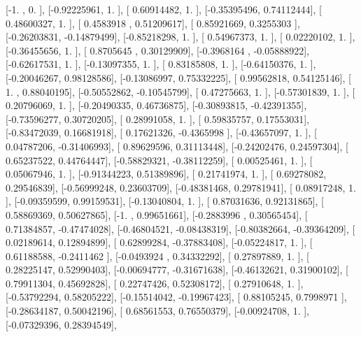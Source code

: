 \documentclass{article}
\begin{document}
       [-1.        ,  0.        ],
       [-0.92225961,  1.        ],
       [ 0.60914482,  1.        ],
       [-0.35395496,  0.74112444],
       [ 0.48600327,  1.        ],
       [ 0.4583918 ,  0.51209617],
       [ 0.85921669,  0.3255303 ],
       [-0.26203831, -0.14879499],
       [-0.85218298,  1.        ],
       [ 0.54967373,  1.        ],
       [ 0.02220102,  1.        ],
       [-0.36455656,  1.        ],
       [ 0.8705645 ,  0.30129909],
       [-0.3968164 , -0.05888922],
       [-0.62617531,  1.        ],
       [-0.13097355,  1.        ],
       [ 0.83185808,  1.        ],
       [-0.64150376,  1.        ],
       [-0.20046267,  0.98128586],
       [-0.13086997,  0.75332225],
       [ 0.99562818,  0.54125146],
       [ 1.        ,  0.88040195],
       [-0.50552862, -0.10545799],
       [ 0.47275663,  1.        ],
       [-0.57301839,  1.        ],
       [ 0.20796069,  1.        ],
       [-0.20490335,  0.46736875],
       [-0.30893815, -0.42391355],
       [-0.73596277,  0.30720205],
       [ 0.28991058,  1.        ],
       [ 0.59835757,  0.17553031],
       [-0.83472039,  0.16681918],
       [ 0.17621326, -0.4365998 ],
       [-0.43657097,  1.        ],
       [ 0.04787206, -0.31406993],
       [ 0.89629596,  0.31113448],
       [-0.24202476,  0.24597304],
       [ 0.65237522,  0.44764447],
       [-0.58829321, -0.38112259],
       [ 0.00525461,  1.        ],
       [ 0.05067946,  1.        ],
       [-0.91344223,  0.51389896],
       [ 0.21741974,  1.        ],
       [ 0.69278082,  0.29546839],
       [-0.56999248,  0.23603709],
       [-0.48381468,  0.29781941],
       [ 0.08917248,  1.        ],
       [-0.09359599,  0.99159531],
       [-0.13040804,  1.        ],
       [ 0.87031636,  0.92131865],
       [ 0.58869369,  0.50627865],
       [-1.        ,  0.99651661],
       [-0.2883996 ,  0.30565454],
       [ 0.71384857, -0.47474028],
       [-0.46804521, -0.08438319],
       [-0.80382664, -0.39364209],
       [ 0.02189614,  0.12894899],
       [ 0.62899284, -0.37883408],
       [-0.05224817,  1.        ],
       [ 0.61188588, -0.2411462 ],
       [-0.0493924 ,  0.34332292],
       [ 0.27897889,  1.        ],
       [ 0.28225147,  0.52990403],
       [-0.00694777, -0.31671638],
       [-0.46132621,  0.31900102],
       [ 0.79911304,  0.45692828],
       [ 0.22747426,  0.52308172],
       [ 0.27910648,  1.        ],
       [-0.53792294,  0.58205222],
       [-0.15514042, -0.19967423],
       [ 0.88105245,  0.7998971 ],
       [-0.28634187,  0.50042196],
       [ 0.68561553,  0.76550379],
       [-0.00924708,  1.        ],
       [-0.07329396,  0.28394549],
\end{document}

